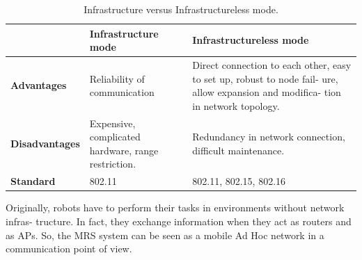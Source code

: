 \documentclass[11pt,openany]{book}
\begin{document}
\begin{table}[H]
    \centering
    \caption{Infrastructure versus Infrastructureless mode.}
    \label{tab:4.1}
    \begin{tabular}{|l|p{4.5cm}|p{4.5cm}|}\hline
                               & \textbf{Infrastructure mode}      & \textbf{Infrastructureless mode}
        \\\hline
        \textbf{Advantages}    & Reliability of communication      & Direct connection to each other,
        easy to set up, robust to node fail-
        ure, allow expansion and modiﬁca-
        tion in network topology.                                                                     \\\hline
        \textbf{Disadvantages} & Expensive, complicated hardware,
        range restriction.     & Redundancy in network connection,
        diﬃcult maintenance.                                                                          \\\hline
        \textbf{Standard}      & 802.11                            & 802.11, 802.15, 802.16           \\\hline
    \end{tabular}
\end{table}
Originally, robots have to perform their tasks in environments without network infras- tructure. In fact, they exchange information when they act as routers and as APs. So, the MRS system can be seen as a mobile Ad Hoc network in a communication point of view.
\end{document}
